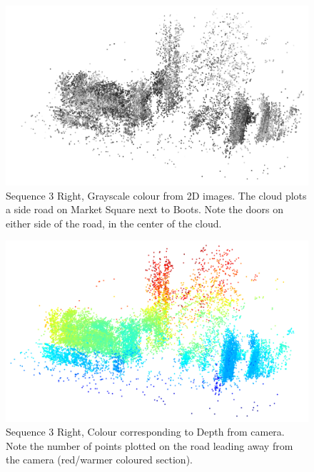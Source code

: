 \documentclass[11pt]{article}
\begin{document}
\begin{figure}[h]
	\centering
	\includegraphics[scale=0.5]{Sequence3Right_Grayscale}
	\caption{Sequence 3 Right, Grayscale colour from 2D images. The cloud plots a side road on Market Square next to Boots. Note the doors on either side of the road, in the center of the cloud.}
	\label{fig:3_right_gray}
\end{figure}
\begin{figure}[h]
	\centering
	\includegraphics[scale=0.5]{Sequence3Right_Depth}
	\caption{Sequence 3 Right, Colour corresponding to Depth from camera. Note the number of points plotted on the road leading away from the camera (red/warmer coloured section).}
	\label{fig:3_right_depth}
\end{figure}
\end{document}
